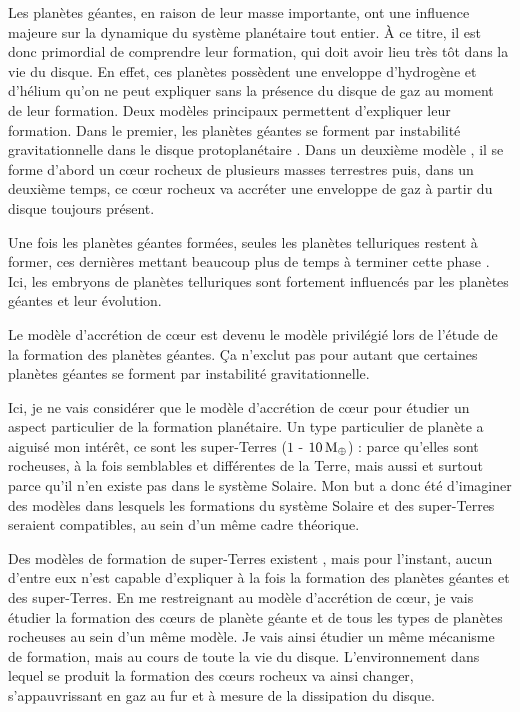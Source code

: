 Les planètes géantes, en raison de leur masse importante, ont une influence majeure sur la dynamique du système planétaire tout entier. À ce titre, il est donc primordial de comprendre leur formation, qui doit avoir lieu très tôt dans la vie du disque. En effet, ces planètes possèdent une enveloppe d'hydrogène et d'hélium qu'on ne peut expliquer sans la présence du disque de gaz au moment de leur formation. Deux modèles principaux permettent d'expliquer leur formation. Dans le premier, les planètes géantes se forment par instabilité gravitationnelle dans le disque protoplanétaire \citep{boss1997giant}. Dans un deuxième modèle \citep{pollack1996formation, alibert2004migration, levison2010modeling}, il se forme d'abord un cœur rocheux de plusieurs masses terrestres puis, dans un deuxième temps, ce cœur rocheux va accréter une enveloppe de gaz à partir du disque toujours présent. 

Une fois les planètes géantes formées, seules les planètes telluriques restent à former, ces dernières mettant beaucoup plus de temps à terminer cette phase \citep{morbidelli2012building}. Ici, les embryons de planètes telluriques sont fortement influencés par les planètes géantes et leur évolution. 

Le modèle d'accrétion de cœur est devenu le modèle privilégié lors de l'étude de la formation des planètes géantes. Ça n'exclut pas pour autant que certaines planètes géantes se forment par instabilité gravitationnelle. 

Ici, je ne vais considérer que le modèle d'accrétion de cœur pour étudier un aspect particulier de la formation planétaire. Un type particulier de planète a aiguisé mon intérêt, ce sont les super-Terres ($1$ - $10\mathrm{\thinspace M_\oplus}$) : parce
qu'elles sont rocheuses, à la fois semblables et différentes de la Terre, mais aussi et surtout parce qu'il n'en existe pas dans
le système Solaire. Mon but a donc été d'imaginer des modèles dans lesquels les formations du système Solaire et des
super-Terres seraient compatibles, au sein d'un même cadre théorique.

Des modèles de formation de super-Terres existent \citep{terquem2007migration, chiang2013minimum}, mais pour l'instant, aucun d'entre eux n'est capable d'expliquer à la fois la formation des planètes géantes et des super-Terres.  En me restreignant au modèle d'accrétion de cœur, je vais étudier la formation des cœurs de planète géante et de tous les types de planètes rocheuses au sein d'un même modèle. Je vais ainsi étudier un même mécanisme de formation, mais au cours de toute la vie du disque. L'environnement dans lequel se produit la formation des cœurs rocheux va ainsi changer, s'appauvrissant en gaz au fur et à mesure de la dissipation du disque.

